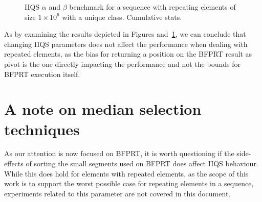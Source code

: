 \begin{figure}

    
    \caption{IIQS $\alpha$ and $\beta$ benchmark for a sequence with repeating elements of size $1\times10^6$ with a unique class. Cumulative stats.}
    \label{FIG:05_ALPHABETA_RELATIONSHIP_SINGLECLASS_STACK}
\end{figure}



As by examining the results depicted in Figures and~\ref{FIG:05_ALPHABETA_RELATIONSHIP_SINGLECLASS_STACK}, we can conclude that changing IIQS parameters does not affect the performance when dealing with repeated elements, as the bias for returning a position on the BFPRT result as pivot is the one directly impacting the performance and not the bounds for BFPRT execution itself.\\

\section{A note on median selection techniques}
\label{SECTION:NOTE_ON_MEDIAN_SELECTION}

As our attention is now focused on BFPRT, it is worth questioning if the side-effects of sorting the small segments used on BFPRT does affect IIQS behaviour. While this does hold for elements with repeated elements, as the scope of this work is to support the worst possible case for repeating elements in a sequence, experiments related to this parameter are not covered in this document.\\


